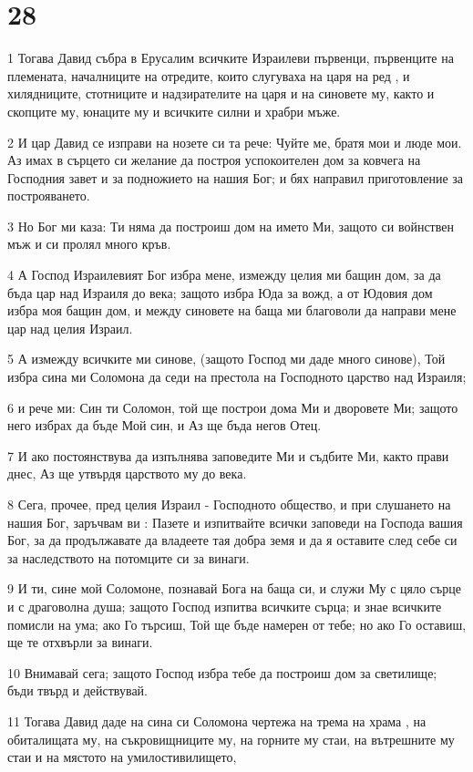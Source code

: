 \chapter{28}

\par 1 Тогава Давид събра в Ерусалим всичките Израилеви първенци, първенците на племената, началниците на отредите, които слугуваха на царя на ред , и хилядниците, стотниците и надзирателите на царя и на синовете му, както и скопците му, юнаците му и всичките силни и храбри мъже.
\par 2 И цар Давид се изправи на нозете си та рече: Чуйте ме, братя мои и люде мои. Аз имах в сърцето си желание да построя успокоителен дом за ковчега на Господния завет и за подножието на нашия Бог; и бях направил приготовление за построяването.
\par 3 Но Бог ми каза: Ти няма да построиш дом на името Ми, защото си войнствен мъж и си пролял много кръв.
\par 4 А Господ Израилевият Бог избра мене, измежду целия ми бащин дом, за да бъда цар над Израиля до века; защото избра Юда за вожд, а от Юдовия дом избра моя бащин дом, и между синовете на баща ми благоволи да направи мене цар над целия Израил.
\par 5 А измежду всичките ми синове, (защото Господ ми даде много синове), Той избра сина ми Соломона да седи на престола на Господното царство над Израиля;
\par 6 и рече ми: Син ти Соломон, той ще построи дома Ми и дворовете Ми; защото него избрах да бъде Мой син, и Аз ще бъда негов Отец.
\par 7 И ако постоянствува да изпълнява заповедите Ми и съдбите Ми, както прави днес, Аз ще утвърдя царството му до века.
\par 8 Сега, прочее, пред целия Израил - Господното общество, и при слушането на нашия Бог, заръчвам ви : Пазете и изпитвайте всички заповеди на Господа вашия Бог, за да продължавате да владеете тая добра земя и да я оставите след себе си за наследството на потомците си за винаги.
\par 9 И ти, сине мой Соломоне, познавай Бога на баща си, и служи Му с цяло сърце и с драговолна душа; защото Господ изпитва всичките сърца; и знае всичките помисли на ума; ако Го търсиш, Той ще бъде намерен от тебе; но ако Го оставиш, ще те отхвърли за винаги.
\par 10 Внимавай сега; защото Господ избра тебе да построиш дом за светилище; бъди твърд и действувай.
\par 11 Тогава Давид даде на сина си Соломона чертежа на трема на храма , на обиталищата му, на съкровищниците му, на горните му стаи, на вътрешните му стаи и на мястото на умилостивилището,

